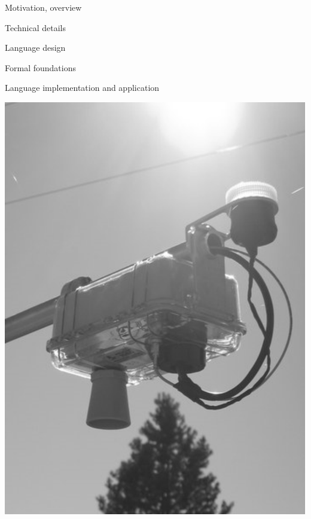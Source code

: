 
\begin{cenumerate}
\item Motivation, overview
\item Technical details
\begin{citemize}
\item Language design 
\item Formal foundations
\end{citemize}
\item Language implementation and application
\end{cenumerate}
\stopslide


\begin{center}
\includegraphics[scale=.50]{brainbox} 

\end{center}
